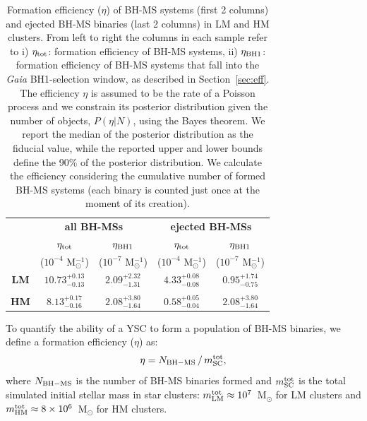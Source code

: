\documentclass[fleqn,usenatbib]{mnras}
\newcommand{\bh}{\textit{Gaia} BH1}
\begin{document}
\begin{table}
\centering
\begin{tabular}{@{}c|cc|cc@{}}
\hline
\textbf{}   & \multicolumn{2}{c}{\textbf{all BH-MSs}}  & \multicolumn{2}{c}{\textbf{ejected BH-MSs}}     \\ %
\textbf{}   & \textbf{$\eta_{\rm{tot}}$}  & \textbf{$\eta_{\rm BH1}$} & \textbf{$\eta_{\rm{tot}}$}  & \textbf{$\eta_{\rm BH1}$} \\ 
 \textbf{}   &  ($10^{-4}$ M$_{\odot}^{-1}$)  &    ($10^{-7}$ M$_{\odot}^{-1}$)  &  ($10^{-4}$ M$_{\odot}^{-1}$)   &  ($10^{-7}$ M$_{\odot}^{-1}$)   \\ \hline
\textbf{LM} & $10.73^{+0.13}_{-0.13}$      & $2.09^{+2.32}_{-1.31}$  & $4.33^{+0.08}_{-0.08}$  &  $0.95^{+1.74}_{-0.75}$    \\
& & & &  \\
\textbf{HM} & $8.13^{+0.17}_{-0.16}$       & $2.08^{+3.80}_{-1.64}$    &$0.58^{+0.05}_{-0.04}$  &  $2.08^{+3.80}_{-1.64}$    \\ \hline
\end{tabular}
\caption{Formation efficiency ($\eta$) of BH-MS systems (first 2 columns) and ejected BH-MS binaries (last 2 columns) in LM and HM clusters. From left to right the columns in each sample refer to i) $\eta_{\rm{tot}}$: formation efficiency of  BH-MS systems, 
ii) $\eta_{\rm{BH1}}$: formation efficiency of BH-MS systems 
that fall into the \bh{}-selection window, 
as described in Section~\ref{sec:eff}. The efficiency $\eta$ is assumed to be the rate of a Poisson process and we constrain its posterior distribution given the number of objects, $P(\eta|N)$, using the Bayes theorem. We report the median of the posterior distribution as the fiducial value, while the  reported upper and lower bounds define the 90\% of the posterior distribution. We calculate the efficiency considering the cumulative number of formed BH-MS systems (each binary is counted just once at the moment of its creation).}
\label{tab:efficiency}
\end{table}


To quantify the ability of a YSC to form a population of BH-MS binaries, we define a formation efficiency ($\eta$) as:
\begin{equation}
\centering
\eta = N_{\rm{BH-MS}}\, /\, m_{\rm{SC}}^{\rm{tot}},
\end{equation}
where $N_{\rm{BH-MS}}$ is the number of BH-MS binaries formed and $m_{\rm{SC}}^{\rm{tot}}$ is the total simulated initial stellar mass in star clusters: $m_{\rm{LM}}^{\rm{tot}} \approx 10^7$~M$_{\odot}$ for  LM clusters and $m_{\rm{HM}}^{\rm{tot}} \approx 8\times 10^6$~M$_{\odot}$ for HM clusters.
 
\end{document}
